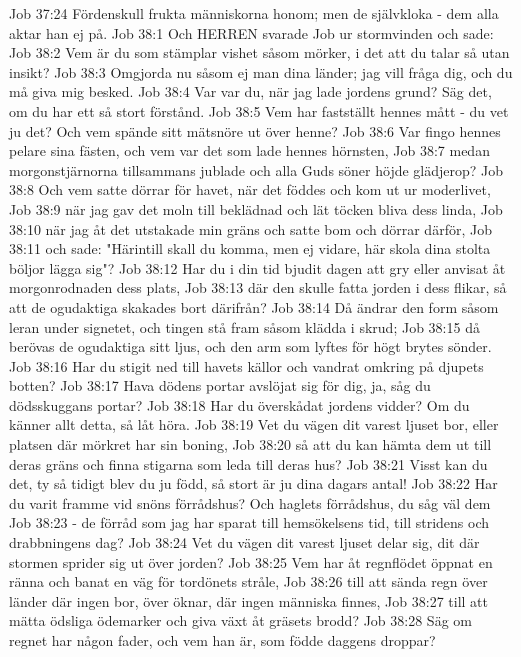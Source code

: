 Job 37:24  Fördenskull frukta människorna honom; men de självkloka - dem alla aktar han ej på.
Job 38:1  Och HERREN svarade Job ur stormvinden och sade:
Job 38:2  Vem är du som stämplar vishet såsom mörker, i det att du talar så utan insikt?
Job 38:3  Omgjorda nu såsom ej man dina länder; jag vill fråga dig, och du må giva mig besked.
Job 38:4  Var var du, när jag lade jordens grund? Säg det, om du har ett så stort förstånd.
Job 38:5  Vem har fastställt hennes mått - du vet ju det? Och vem spände sitt mätsnöre ut över henne?
Job 38:6  Var fingo hennes pelare sina fästen, och vem var det som lade hennes hörnsten,
Job 38:7  medan morgonstjärnorna tillsammans jublade och alla Guds söner höjde glädjerop?
Job 38:8  Och vem satte dörrar för havet, när det föddes och kom ut ur moderlivet,
Job 38:9  när jag gav det moln till beklädnad och lät töcken bliva dess linda,
Job 38:10  när jag åt det utstakade min gräns och satte bom och dörrar därför,
Job 38:11  och sade: "Härintill skall du komma, men ej vidare, här skola dina stolta böljor lägga sig"?
Job 38:12  Har du i din tid bjudit dagen att gry eller anvisat åt morgonrodnaden dess plats,
Job 38:13  där den skulle fatta jorden i dess flikar, så att de ogudaktiga skakades bort därifrån?
Job 38:14  Då ändrar den form såsom leran under signetet, och tingen stå fram såsom klädda i skrud;
Job 38:15  då berövas de ogudaktiga sitt ljus, och den arm som lyftes för högt brytes sönder.
Job 38:16  Har du stigit ned till havets källor och vandrat omkring på djupets botten?
Job 38:17  Hava dödens portar avslöjat sig för dig, ja, såg du dödsskuggans portar?
Job 38:18  Har du överskådat jordens vidder? Om du känner allt detta, så låt höra.
Job 38:19  Vet du vägen dit varest ljuset bor, eller platsen där mörkret har sin boning,
Job 38:20  så att du kan hämta dem ut till deras gräns och finna stigarna som leda till deras hus?
Job 38:21  Visst kan du det, ty så tidigt blev du ju född, så stort är ju dina dagars antal!
Job 38:22  Har du varit framme vid snöns förrådshus? Och haglets förrådshus, du såg väl dem
Job 38:23  - de förråd som jag har sparat till hemsökelsens tid, till stridens och drabbningens dag?
Job 38:24  Vet du vägen dit varest ljuset delar sig, dit där stormen sprider sig ut över jorden?
Job 38:25  Vem har åt regnflödet öppnat en ränna och banat en väg för tordönets stråle,
Job 38:26  till att sända regn över länder där ingen bor, över öknar, där ingen människa finnes,
Job 38:27  till att mätta ödsliga ödemarker och giva växt åt gräsets brodd?
Job 38:28  Säg om regnet har någon fader, och vem han är, som födde daggens droppar?
